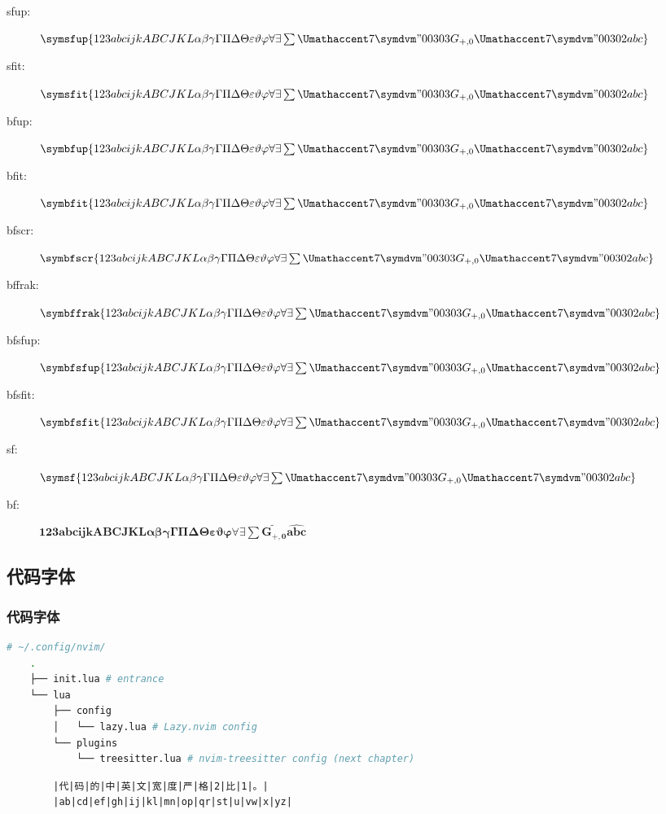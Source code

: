 \documentclass[
aspectratio=169,%
]{beamer}
\newcommand{\mathtestcontent}{123abcijkABCJKL\alpha \beta \gamma \Gamma \Pi \Delta \Theta \varepsilon \vartheta \varphi \forall \exists \sum \widetilde{G_{+, 0}} \widehat{abc}}
\begin{document}
\begin{frame}
        \begin{description}
            \item[sfup:]$\symsfup{\mathtestcontent}$
            \item[sfit:]$\symsfit{\mathtestcontent}$
            \item[bfup:]$\symbfup{\mathtestcontent}$
            \item[bfit:]$\symbfit{\mathtestcontent}$
            \item[bfscr:]$\symbfscr{\mathtestcontent}$
            \item[bffrak:]$\symbffrak{\mathtestcontent}$
            \item[bfsfup:]$\symbfsfup{\mathtestcontent}$
            \item[bfsfit:]$\symbfsfit{\mathtestcontent}$
            \item[sf:]$\symsf{\mathtestcontent}$
            \item[bf:]$\symbf{\mathtestcontent}$
        \end{description}
\end{frame}
\subsection{代码字体}

\begin{frame}[containsverbatim]\frametitle{代码字体}
    \begin{lstlisting}[language=bash]
    # ~/.config/nvim/
    .
    ├── init.lua # entrance
    └── lua
        ├── config
        │   └── lazy.lua # Lazy.nvim config
        └── plugins
            └── treesitter.lua # nvim-treesitter config (next chapter)
    \end{lstlisting}

    \begin{verbatim}
        |代|码|的|中|英|文|宽|度|严|格|2|比|1|。|
        |ab|cd|ef|gh|ij|kl|mn|op|qr|st|u|vw|x|yz|
    \end{verbatim}
\end{frame}
\end{document}
